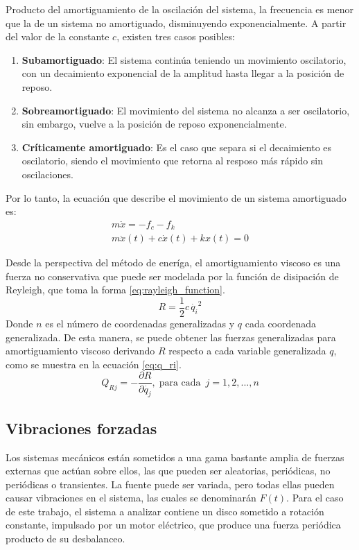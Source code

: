 Producto del amortiguamiento de la oscilación del sistema, la frecuencia es menor que la de un sistema no amortiguado, disminuyendo exponencialmente. A partir del valor de la constante $c$, existen tres casos posibles:
\begin{enumerate}
	\item \textbf{Subamortiguado}: El sistema continúa teniendo un movimiento oscilatorio, con un decaimiento exponencial de la amplitud hasta llegar a la posición de reposo.
	\item \textbf{Sobreamortiguado}: El movimiento del sistema no alcanza a ser oscilatorio, sin embargo, vuelve a la posición de reposo exponencialmente.
	\item \textbf{Críticamente amortiguado}: Es el caso que separa si el decaimiento es oscilatorio, siendo el movimiento que retorna al resposo más rápido sin oscilaciones.
\end{enumerate}

Por lo tanto, la ecuación que describe el movimiento de un sistema amortiguado es:
\begin{gather*}
	m\ddot{x} = -f_c - f_k \\
	m\ddot{x}(t) + c\dot{x}(t) + kx(t) = 0 
\end{gather*}

Desde la perspectiva del método de eneríga, el amortiguamiento viscoso es una fuerza no conservativa que puede ser modelada por la función de disipación de Reyleigh, que toma la forma \ref{eq:rayleigh_function}.
\begin{equation}\label{eq:rayleigh_function}
	R = \frac{1}{2}c\,\dot{q_i}^2
\end{equation} 
Donde $n$ es el número de coordenadas generalizadas y $q$ cada coordenada generalizada. De esta manera, se puede obtener las fuerzas generalizadas para amortiguamiento viscoso derivando $R$ respecto a cada variable generalizada $q$, como se muestra en la ecuación \ref{eq:q_ri}.
\begin{equation}\label{eq:q_ri}
	Q_{Rj} = -\frac{\partial R}{\partial \dot{q_j}}, \; \text{para cada }\, j=1,2,...,n
\end{equation}

\subsection{Vibraciones forzadas}
\label{sec:vib_forzadas}
Los sistemas mecánicos están sometidos a una gama bastante amplia de fuerzas externas que actúan sobre ellos, las que pueden ser aleatorias, periódicas, no periódicas o transientes. La fuente puede ser variada, pero todas ellas pueden causar vibraciones en el sistema, las cuales se denominarán $F(t)$. Para el caso de este trabajo, el sistema a analizar contiene un disco sometido a rotación constante, impulsado por un motor eléctrico, que produce una fuerza periódica producto de su desbalanceo.

